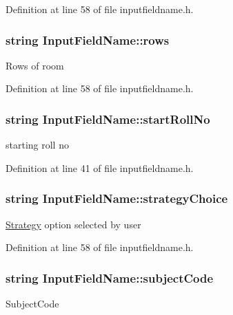 Definition at line 58 of file inputfieldname.\-h.

\hypertarget{classInputFieldName_a1b5a819437f52b4bb6b0ea59f542f9a9}{
\subsubsection[{rows}]{\setlength{\rightskip}{0pt plus 5cm}string Input\-Field\-Name\-::rows}}\label{classInputFieldName_a1b5a819437f52b4bb6b0ea59f542f9a9}
Rows of room 

Definition at line 58 of file inputfieldname.\-h.

\hypertarget{classInputFieldName_a24baf5c915b4ee0fb8678e03adec043a}{
\subsubsection[{start\-Roll\-No}]{\setlength{\rightskip}{0pt plus 5cm}string Input\-Field\-Name\-::start\-Roll\-No}}\label{classInputFieldName_a24baf5c915b4ee0fb8678e03adec043a}
starting roll no 

Definition at line 41 of file inputfieldname.\-h.

\hypertarget{classInputFieldName_a9a6b827d404cb279cc0ed836c069e4a9}{
\subsubsection[{strategy\-Choice}]{\setlength{\rightskip}{0pt plus 5cm}string Input\-Field\-Name\-::strategy\-Choice}}\label{classInputFieldName_a9a6b827d404cb279cc0ed836c069e4a9}
\hyperlink{classStrategy}{Strategy} option selected by user 

Definition at line 58 of file inputfieldname.\-h.

\hypertarget{classInputFieldName_af1cc6871c33344c365e6e25ea482bd48}{
\subsubsection[{subject\-Code}]{\setlength{\rightskip}{0pt plus 5cm}string Input\-Field\-Name\-::subject\-Code}}\label{classInputFieldName_af1cc6871c33344c365e6e25ea482bd48}
Subject\-Code 

